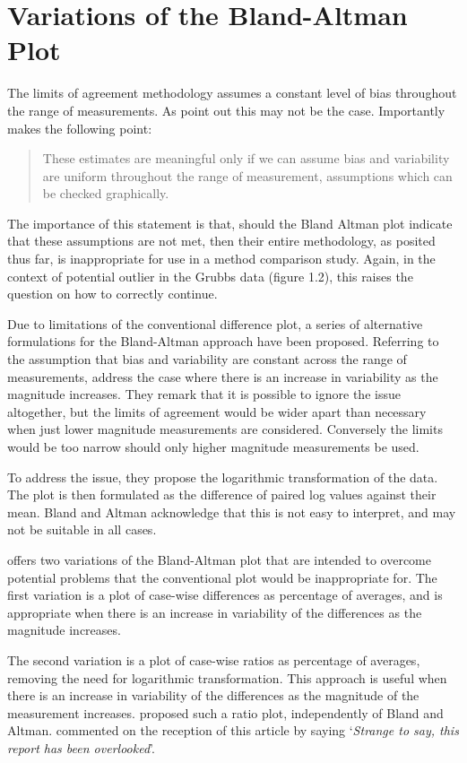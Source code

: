 \documentclass[12pt, a4paper]{report}
\theoremstyle{plain}
\theoremstyle{definition}
\theoremstyle{remark}
\begin{document}
	\section{Variations of the Bland-Altman Plot} 
	The limits of agreement methodology assumes a constant level of bias throughout the range of measurements. As \citet*{BA86} point out this may not be the case. 
	Importantly \citet{BA99} makes the following point:
	\begin{quote}These estimates are meaningful only if we can assume
		bias and variability are uniform throughout the range of
		measurement, assumptions which can be checked graphically.
	\end{quote}
	
	The importance of this statement is that, should the Bland Altman plot indicate that these assumptions are not met, then their
	entire methodology, as posited thus far, is inappropriate for use
	in a method comparison study. Again, in the context of potential
	outlier in the Grubbs data (figure 1.2), this raises the question
	on how to correctly continue. 
	
	Due to limitations of the conventional difference plot, a series of alternative formulations for the Bland-Altman approach have been proposed. Referring to the assumption that bias and variability are constant across the range of measurements, \citet{BA99} address the case where there is an increase in variability as the magnitude increases. They remark that it is possible to ignore the issue altogether, but the limits of agreement would be wider apart than necessary when just lower magnitude measurements are considered. Conversely the limits would be too narrow should only higher magnitude measurements be used. 
	
	To address the issue, they propose the logarithmic transformation of the data. The plot is then formulated as the difference of paired log values against their mean. Bland and Altman acknowledge that this is not easy to interpret, and may not be suitable in all cases.
	
	\citet{BA99} offers two variations of the Bland-Altman plot that are intended to overcome potential problems that the conventional plot would be inappropriate for. The first variation is a plot of case-wise differences as percentage of averages, and is appropriate when there is an increase in variability of the differences as the magnitude increases. 
	
	The second variation is a plot of case-wise ratios as percentage of averages, removing the need for logarithmic transformation. This approach is useful when there is an increase in variability of the differences as the magnitude of the measurement increases. \citet{Eksborg} proposed such a ratio plot, independently of Bland and Altman. \citet{Dewitte} commented on the reception of this article by saying `\textit{Strange to say, this report has been overlooked}'.
	
\end{document}
